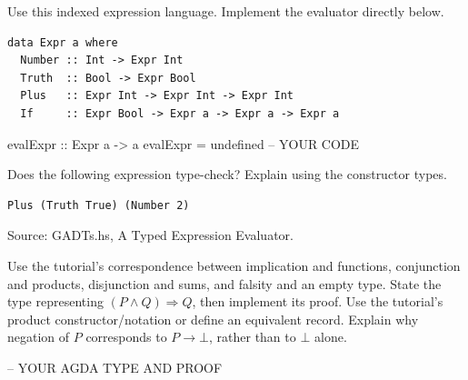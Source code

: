 \clearpage
{}
Use this indexed expression language. Implement the evaluator directly below.
\par\noindent\begin{minipage}{\linewidth}
\begin{lstlisting}
data Expr a where
  Number :: Int -> Expr Int
  Truth  :: Bool -> Expr Bool
  Plus   :: Expr Int -> Expr Int -> Expr Int
  If     :: Expr Bool -> Expr a -> Expr a -> Expr a
\end{lstlisting}
\end{minipage}\par
\par\noindent\begin{minipage}{\linewidth}
\begin{codeanswer}
evalExpr :: Expr a -> a
evalExpr = undefined  -- YOUR CODE
\end{codeanswer}
\end{minipage}\par
Does the following expression type-check? Explain using the constructor types.
\par\noindent\begin{minipage}{\linewidth}
\begin{lstlisting}
Plus (Truth True) (Number 2)
\end{lstlisting}
\end{minipage}\par
Source: GADTs.hs, A Typed Expression Evaluator.

Use the tutorial's correspondence between implication and functions, conjunction
and products, disjunction and sums, and falsity and an empty type.
State the type representing $(P\land Q)\Rightarrow Q$, then implement its proof.
Use the tutorial's product constructor/notation or define an equivalent record.
Explain why negation of $P$ corresponds to $P\to\bot$, rather than to $\bot$ alone.
\par\noindent\begin{minipage}{\linewidth}
\begin{codeanswer}
-- YOUR AGDA TYPE AND PROOF
\end{codeanswer}
\end{minipage}\par
{}
